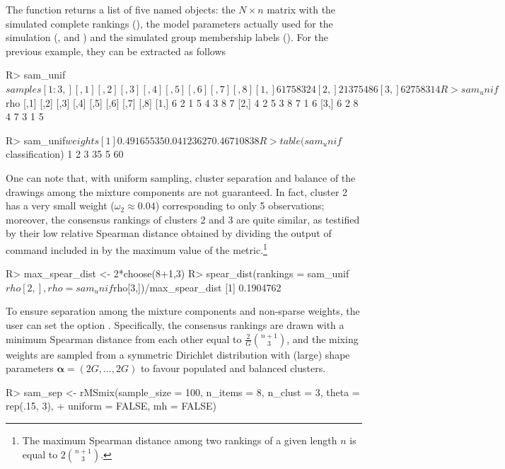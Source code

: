 The function  returns a list of five named objects: the $N\times n$ matrix with the simulated complete rankings (), the model parameters actually used for the simulation (,  and ) and the simulated group membership labels (). For the previous example, they can be extracted as follows
\begin{example}
R> sam_unif$samples[1:3,]
     [,1] [,2] [,3] [,4] [,5] [,6] [,7] [,8]
[1,]    6    1    7    5    8    3    2    4
[2,]    2    1    3    7    5    4    8    6
[3,]    6    2    7    5    8    3    1    4

R> sam_unif$rho
     [,1] [,2] [,3] [,4] [,5] [,6] [,7] [,8]
[1,]    6    2    1    5    4    3    8    7
[2,]    4    2    5    3    8    7    1    6
[3,]    6    2    8    4    7    3    1    5

R> sam_unif$weights
[1] 0.49165535 0.04123627 0.46710838

R> table(sam_unif$classification)
 1  2  3
35  5 60
\end{example}
One can note that, with uniform sampling, cluster separation and balance of the drawings among the mixture components are not guaranteed. In fact, cluster 2 has a very small weight ($\omega_2 \approx 0.04$) corresponding to only 5 observations; moreover, the consensus rankings of clusters 2 and 3 are quite similar, as testified by their low relative Spearman distance obtained by dividing the output of command  included in  by the maximum value of the metric.\footnote{The maximum Spearman distance among two rankings of a given length $n$ is equal to $2\binom{n+1}{3}$.}
\begin{example}
R> max_spear_dist <- 2*choose(8+1,3)
R> spear_dist(rankings = sam_unif$rho[2,], rho = sam_unif$rho[3,])/max_spear_dist
[1] 0.1904762
\end{example}
To ensure separation among the mixture components and non-sparse weights, the user can set the option . Specifically, the consensus rankings are drawn with a minimum Spearman distance from each other equal to $\frac{2}{G}\binom{n+1}{3}$, and the mixing weights are sampled from a symmetric Dirichlet distribution with (large) shape parameters $\bm\alpha=(2G,\dots,2G)$ to favour populated and balanced clusters.
\begin{example}
R> sam_sep <- rMSmix(sample_size = 100, n_items = 8, n_clust = 3, theta = rep(.15, 3),
+               uniform = FALSE, mh = FALSE)
\end{example}
